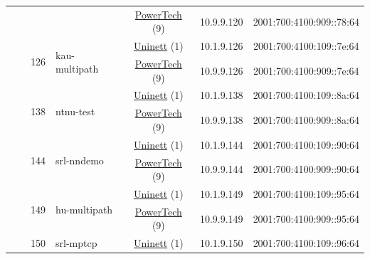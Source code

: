 \begin{small}
\begin{center}
\begin{longtable}{|c|c|c|c|c|c|c|c|}
  &  &  &  & \multicolumn{2}{|c|}{\tiny{\href{http://www.powertech.no}{PowerTech} (9)}} & \tiny{10.9.9.120} & \tiny{2001:700:4100:909::78:64} \\* \cline{3-3}\cline{4-4}\cline{5-5}\cline{6-6}\cline{7-7}\cline{8-8}
  &  & \multirow{2}{*}{\tiny{126}} & \multicolumn{1}{|l|}{\multirow{2}{*}{\tiny{kau-multipath}}} & \multicolumn{2}{|c|}{\tiny{\href{https://www.uninett.no}{Uninett} (1)}} & \tiny{10.1.9.126} & \tiny{2001:700:4100:109::7e:64} \\* \cline{5-5}\cline{6-6}\cline{7-7}\cline{8-8}
  &  &  &  & \multicolumn{2}{|c|}{\tiny{\href{http://www.powertech.no}{PowerTech} (9)}} & \tiny{10.9.9.126} & \tiny{2001:700:4100:909::7e:64} \\* \cline{3-3}\cline{4-4}\cline{5-5}\cline{6-6}\cline{7-7}\cline{8-8}
  &  & \multirow{2}{*}{\tiny{138}} & \multicolumn{1}{|l|}{\multirow{2}{*}{\tiny{ntnu-test}}} & \multicolumn{2}{|c|}{\tiny{\href{https://www.uninett.no}{Uninett} (1)}} & \tiny{10.1.9.138} & \tiny{2001:700:4100:109::8a:64} \\* \cline{5-5}\cline{6-6}\cline{7-7}\cline{8-8}
  &  &  &  & \multicolumn{2}{|c|}{\tiny{\href{http://www.powertech.no}{PowerTech} (9)}} & \tiny{10.9.9.138} & \tiny{2001:700:4100:909::8a:64} \\* \cline{3-3}\cline{4-4}\cline{5-5}\cline{6-6}\cline{7-7}\cline{8-8}
  &  & \multirow{2}{*}{\tiny{144}} & \multicolumn{1}{|l|}{\multirow{2}{*}{\tiny{srl-nndemo}}} & \multicolumn{2}{|c|}{\tiny{\href{https://www.uninett.no}{Uninett} (1)}} & \tiny{10.1.9.144} & \tiny{2001:700:4100:109::90:64} \\* \cline{5-5}\cline{6-6}\cline{7-7}\cline{8-8}
  &  &  &  & \multicolumn{2}{|c|}{\tiny{\href{http://www.powertech.no}{PowerTech} (9)}} & \tiny{10.9.9.144} & \tiny{2001:700:4100:909::90:64} \\* \cline{3-3}\cline{4-4}\cline{5-5}\cline{6-6}\cline{7-7}\cline{8-8}
  &  & \multirow{2}{*}{\tiny{149}} & \multicolumn{1}{|l|}{\multirow{2}{*}{\tiny{hu-multipath}}} & \multicolumn{2}{|c|}{\tiny{\href{https://www.uninett.no}{Uninett} (1)}} & \tiny{10.1.9.149} & \tiny{2001:700:4100:109::95:64} \\* \cline{5-5}\cline{6-6}\cline{7-7}\cline{8-8}
  &  &  &  & \multicolumn{2}{|c|}{\tiny{\href{http://www.powertech.no}{PowerTech} (9)}} & \tiny{10.9.9.149} & \tiny{2001:700:4100:909::95:64} \\* \cline{3-3}\cline{4-4}\cline{5-5}\cline{6-6}\cline{7-7}\cline{8-8}
  &  & \multirow{2}{*}{\tiny{150}} & \multicolumn{1}{|l|}{\multirow{2}{*}{\tiny{srl-mptcp}}} & \multicolumn{2}{|c|}{\tiny{\href{https://www.uninett.no}{Uninett} (1)}} & \tiny{10.1.9.150} & \tiny{2001:700:4100:109::96:64} \\* \cline{5-5}\cline{6-6}\cline{7-7}\cline{8-8}

\end{longtable}
\end{center}
\end{small}
